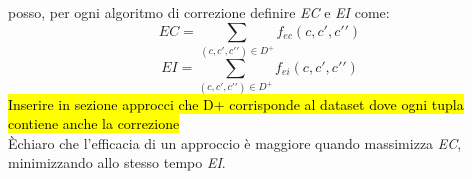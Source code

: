 \documentclass[12pt]{article}
\newcommand{\E}{È}
\begin{document}
posso, per ogni algoritmo di correzione definire \textit{EC} e \textit{EI} come:
\begin{equation}
	EC = \sum_{(c,c\prime,c\prime\prime)\in D^+}f_{ec}(c,c\prime,c\prime\prime)
\end{equation}
\begin{equation}
	EI = \sum_{(c,c\prime,c\prime\prime)\in D^+}f_{ei}(c,c\prime,c\prime\prime)
\end{equation}
\hl{Inserire in sezione approcci che D+ corrisponde al dataset dove ogni tupla contiene anche la correzione}
\\
\E chiaro che l'efficacia di un approccio è maggiore quando massimizza \textit{EC}, minimizzando allo stesso tempo \textit{EI}.



\end{document}
